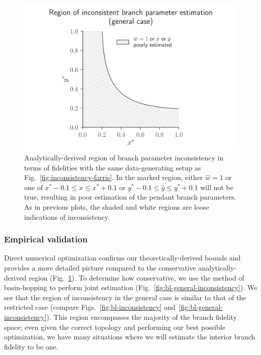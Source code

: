 \documentclass[11pt]{article}
\begin{document}
\begin{figure}
\centering
\includegraphics[width=\textwidth]{bl-loose-inconsistency-inkscape}
\caption{
    Analytically-derived region of branch parameter inconsistency in terms of fidelities with the same data-generating setup as Fig.~\ref{fig:inconsistency-farris}.
    In the marked region, either $\hat{w}=1$ or one of $x^*-0.1 \le \hat{x} \le x^*+0.1$ or $y^*-0.1 \le \hat{y} \le y^*+0.1$ will not be true, resulting in poor estimation of the pendant branch parameters.
    As in previous plots, the shaded and white regions are loose indications of inconsistency.
}
\label{fig:bl-loose-inconsistency}
\end{figure}

\subsubsection*{Empirical validation}

Direct numerical optimization confirms our theoretically-derived bounds and provides a more detailed picture compared to the conservative analytically-derived region (Fig.~\ref{fig:bl-loose-inconsistency}).
To determine how conservative, we use the method of basin-hopping \citep{Wales1997} to perform joint estimation (Fig.~\ref{fig:bl-general-inconsistency}).
We see that the region of inconsistency in the general case is similar to that of the restricted case (compare Figs.~\ref{fig:bl-inconsistency} and~\ref{fig:bl-general-inconsistency}).
This region encompasses the majority of the branch fidelity space; even given the correct topology and performing our best possible optimization, we have many situations where we will estimate the interior branch fidelity to be one.
\end{document}
